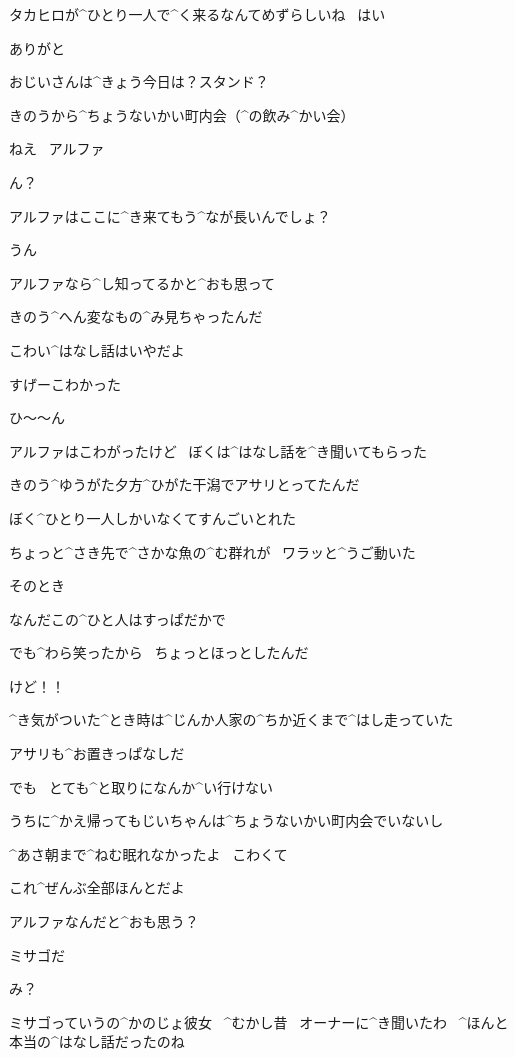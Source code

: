 \A タカヒロが^{ひとり}{一人}で^{く}{来}るなんてめずらしいね
\ はい

\T ありがと

\A おじいさんは^{きょう}{今日}は？スタンド？

\T きのうから^{ちょうないかい}{町内会}（^{の}{飲}み^{かい}{会}）

\T ねえ
\ アルファ

\A ん？

\page
\T アルファはここに^{き}{来}てもう^{なが}{長}いんでしょ？

\A うん

\T アルファなら^{し}{知}ってるかと^{おも}{思}って

\T きのう^{へん}{変}なもの^{み}{見}ちゃったんだ

\A こわい^{はなし}{話}はいやだよ

\T すげーこわかった

\A ひ〜〜ん

\T アルファはこわがったけど
\ ぼくは^{はなし}{話}を^{き}{聞}いてもらった

\page
\T きのう^{ゆうがた}{夕方}^{ひがた}{干潟}でアサリとってたんだ

\T ぼく^{ひとり}{一人}しかいなくてすんごいとれた

\T ちょっと^{さき}{先}で^{さかな}{魚}の^{む}{群}れが
\ ワラッと^{うご}{動}いた

\T そのとき

\page[49]
\T なんだこの^{ひと}{人}はすっぱだかで

\T でも^{わら}{笑}ったから
\ ちょっとほっとしたんだ

\T けど！！

\page[51]
\T ^{き}{気}がついた^{とき}{時}は^{じんか}{人家}の^{ちか}{近}くまで^{はし}{走}っていた

\T アサリも^{お}{置}きっぱなしだ

\T でも
\ とても^{と}{取}りになんか^{い}{行}けない

\T うちに^{かえ}{帰}ってもじいちゃんは^{ちょうないかい}{町内会}でいないし

\T ^{あさ}{朝}まで^{ねむ}{眠}れなかったよ
\ こわくて

\T これ^{ぜんぶ}{全部}ほんとだよ

\T アルファなんだと^{おも}{思}う？

\page
\A ミサゴだ

\T み？

\A ミサゴっていうの^{かのじょ}{彼女}
\ ^{むかし}{昔}
\ オーナーに^{き}{聞}いたわ
\ ^{ほんと}{本当}の^{はなし}{話}だったのね

